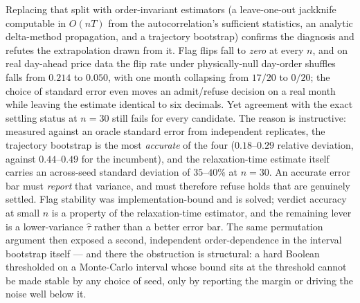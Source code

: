 Replacing that split with order-invariant estimators (a leave-one-out
jackknife computable in $O(nT)$ from the autocorrelation's sufficient
statistics, an analytic delta-method propagation, and a trajectory
bootstrap) confirms the diagnosis and refutes the extrapolation drawn from
it. Flag flips fall to \emph{zero} at every $n$, and on real
day-ahead price data the flip rate under physically-null day-order
shuffles falls from $0.214$ to $0.050$, with one month collapsing from
$17/20$ to $0/20$; the choice of standard error even moves an admit/refuse
decision on a real month while leaving the estimate identical to six
decimals. Yet agreement with the exact settling status at $n = 30$ still
fails for every candidate. The reason is instructive: measured against an
oracle standard error from independent replicates, the trajectory bootstrap
is the most \emph{accurate} of the four ($0.18$--$0.29$ relative deviation,
against $0.44$--$0.49$ for the incumbent), and the relaxation-time estimate
itself carries an across-seed standard deviation of $35$--$40\%$ at
$n = 30$. An accurate error bar must \emph{report} that variance, and must
therefore refuse holds that are genuinely settled. Flag stability was
implementation-bound and is solved; verdict accuracy at small $n$ is a
property of the relaxation-time estimator, and the remaining lever is a
lower-variance $\hat\tau$ rather than a better error bar. The same
permutation argument then exposed a second, independent order-dependence in
the interval bootstrap itself --- and there the obstruction is structural:
a hard Boolean thresholded on a Monte-Carlo interval whose bound sits at
the threshold cannot be made stable by any choice of seed, only by
reporting the margin or driving the noise well below it.
